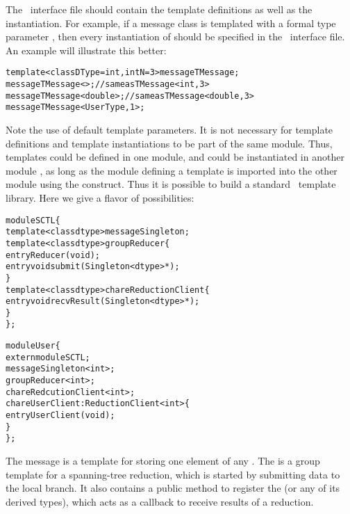 The \charmpp\ interface file should contain the template
definitions as well as the instantiation. For example, if a message
class  is templated with a formal type parameter 
, then every instantiation of  should be specified
in the \charmpp\ interface file. An example will illustrate this better:

\begin{alltt}
  template <class DType=int, int N=3> message TMessage;
  message TMessage<>; // same as TMessage<int,3>
  message TMessage<double>; // same as TMessage<double, 3>
  message TMessage<UserType, 1>;
\end{alltt}

Note the use of default template parameters. It is not necessary for
template definitions and template instantiations to be part of the
same module.  Thus, templates could be defined in one module, and
could be instantiated in another module , as long as the
module defining a template is imported into the other module using the
 construct. Thus it is possible to build a standard
\charmpp\ template library. Here we give a flavor of possibilities:

\begin{alltt}
module SCTL \{
  template <class dtype> message  Singleton;
  template <class dtype> group Reducer \{
    entry Reducer(void);
    entry void submit(Singleton<dtype> *);
  \}
  template <class dtype> chare ReductionClient \{
    entry void recvResult(Singleton<dtype> *);
  \}
\};

module User \{
  extern module SCTL;
  message Singleton<int>;
  group Reducer<int>;
  chare RedcutionClient<int>;
  chare UserClient : ReductionClient<int> \{
    entry UserClient(void);
  \}
\};
\end{alltt}

The  message is a template for storing one element of any
. The  is a group template for a spanning-tree reduction,
which is started by submitting data to the local branch. It also contains a
public method to register the  (or any of its derived
types), which acts as a callback to receive results of a reduction.
